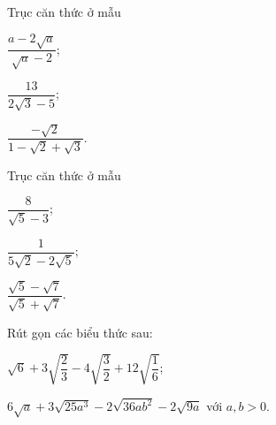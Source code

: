 \begin{bt}%
	Trục căn thức ở mẫu
	\begin{listEX}[3]
	\item $\dfrac{a-2 \sqrt{a}}{\sqrt{a}-2}$; 
	\item $\dfrac{13}{2 \sqrt{3}-5}$;
	\item $\dfrac{-\sqrt{2}}{1-\sqrt{2}+\sqrt{3}}$. 
	\end{listEX}
\end{bt}
\begin{bt}%
	Trục căn thức ở mẫu
	\begin{listEX}[3]
	\item $\dfrac{8}{\sqrt{5}-3}$; 
	\item $\dfrac{1}{5 \sqrt{2}-2 \sqrt{5}}$;
	\item $\dfrac{\sqrt{5}-\sqrt{7}}{\sqrt{5}+\sqrt{7}}$. 
	\end{listEX}
\end{bt}
\begin{bt}%
	Rút gọn các biểu thức sau:
	\begin{listEX}[2]
	\item $\sqrt{6} + 3\sqrt{\dfrac{2}{3}} - 4\sqrt{\dfrac{3}{2}} + 12\sqrt{\dfrac{1}{6}}$;
	\item $6\sqrt{a} + 3\sqrt{25a^3} - 2\sqrt{36a b^2} - 2\sqrt{9a}$ với $a, b>0$.
	\end{listEX}
\end{bt}
